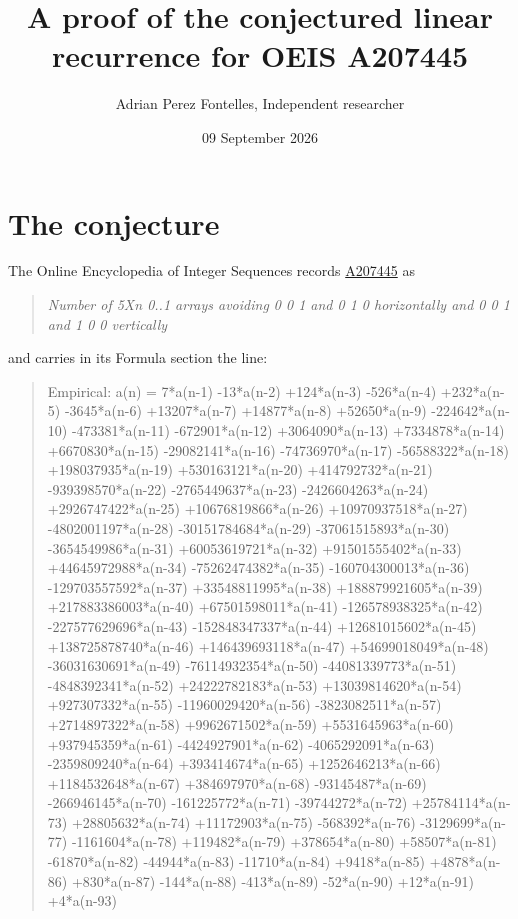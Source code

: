 \documentclass[11pt]{article}
\title{A proof of the conjectured linear recurrence for OEIS A207445}
\author{Adrian Perez Fontelles, Independent researcher}
\date{09 September 2026}
\theoremstyle{definition}
\begin{document}
\maketitle
\section{The conjecture}

The Online Encyclopedia of Integer Sequences records \href{https://oeis.org/A207445}{A207445} as

\begin{quote}\itshape Number of 5Xn 0..1 arrays avoiding 0 0 1 and 0 1 0 horizontally and 0 0 1 and 1 0 0 vertically\end{quote}

and carries in its Formula section the line:

\begin{quote}\ttfamily Empirical: a(n) = 7*a(n-1) -13*a(n-2) +124*a(n-3) -526*a(n-4) +232*a(n-5) -3645*a(n-6) +13207*a(n-7) +14877*a(n-8) +52650*a(n-9) -224642*a(n-10) -473381*a(n-11) -672901*a(n-12) +3064090*a(n-13) +7334878*a(n-14) +6670830*a(n-15) -29082141*a(n-16) -74736970*a(n-17) -56588322*a(n-18) +198037935*a(n-19) +530163121*a(n-20) +414792732*a(n-21) -939398570*a(n-22) -2765449637*a(n-23) -2426604263*a(n-24) +2926747422*a(n-25) +10676819866*a(n-26) +10970937518*a(n-27) -4802001197*a(n-28) -30151784684*a(n-29) -37061515893*a(n-30) -3654549986*a(n-31) +60053619721*a(n-32) +91501555402*a(n-33) +44645972988*a(n-34) -75262474382*a(n-35) -160704300013*a(n-36) -129703557592*a(n-37) +33548811995*a(n-38) +188879921605*a(n-39) +217883386003*a(n-40) +67501598011*a(n-41) -126578938325*a(n-42) -227577629696*a(n-43) -152848347337*a(n-44) +12681015602*a(n-45) +138725878740*a(n-46) +146439693118*a(n-47) +54699018049*a(n-48) -36031630691*a(n-49) -76114932354*a(n-50) -44081339773*a(n-51) -4848392341*a(n-52) +24222782183*a(n-53) +13039814620*a(n-54) +927307332*a(n-55) -11960029420*a(n-56) -3823082511*a(n-57) +2714897322*a(n-58) +9962671502*a(n-59) +5531645963*a(n-60) +937945359*a(n-61) -4424927901*a(n-62) -4065292091*a(n-63) -2359809240*a(n-64) +393414674*a(n-65) +1252646213*a(n-66) +1184532648*a(n-67) +384697970*a(n-68) -93145487*a(n-69) -266946145*a(n-70) -161225772*a(n-71) -39744272*a(n-72) +25784114*a(n-73) +28805632*a(n-74) +11172903*a(n-75) -568392*a(n-76) -3129699*a(n-77) -1161604*a(n-78) +119482*a(n-79) +378654*a(n-80) +58507*a(n-81) -61870*a(n-82) -44944*a(n-83) -11710*a(n-84) +9418*a(n-85) +4878*a(n-86) +830*a(n-87) -144*a(n-88) -413*a(n-89) -52*a(n-90) +12*a(n-91) +4*a(n-93)\end{quote}
\end{document}
